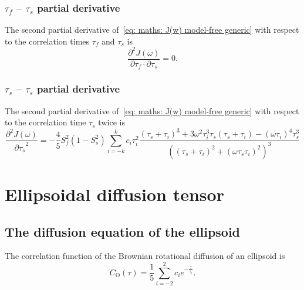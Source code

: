 \subsubsection{$\tau_f$ -- $\tau_s$ partial derivative}

The second partial derivative of~\eqref{eq: maths: J(w) model-free generic} with respect to the correlation times $\tau_f$ and $\tau_s$ is
\begin{equation}
    \frac{\partial^2 J(\omega)}{\partial \tau_f \cdot \partial \tau_s} = 0.
\end{equation}



\subsubsection{$\tau_s$ -- $\tau_s$ partial derivative}

The second partial derivative of~\eqref{eq: maths: J(w) model-free generic} with respect to the correlation time $\tau_s$ twice is
\begin{equation}
    \frac{\partial^2 J(\omega)}{{\partial \tau_s}^2} = -\frac{4}{5} S^2_f(1 - S^2_s) \sum_{i=-k}^k c_i \tau_i^2
        \frac{(\tau_s + \tau_i)^3  +  3 \omega^2 \tau_i^3 \tau_s (\tau_s + \tau_i)  -  (\omega \tau_i)^4 \tau_s^3}
            {\left((\tau_s + \tau_i)^2 + (\omega \tau_s \tau_i)^2 \right)^3}
\end{equation}





\newpage
\section{Ellipsoidal diffusion tensor}





\subsection{The diffusion equation of the ellipsoid} \label{ellipsoid equation}

The correlation function of the Brownian rotational diffusion of an ellipsoid is
\begin{equation} \label{eq: ellipsoid correlation function}
    C_\mathrm{O}(\tau) = \frac{1}{5} \sum^2_{i=-2} c_i e^{-\frac{\tau}{\tau_i}}.
\end{equation}

